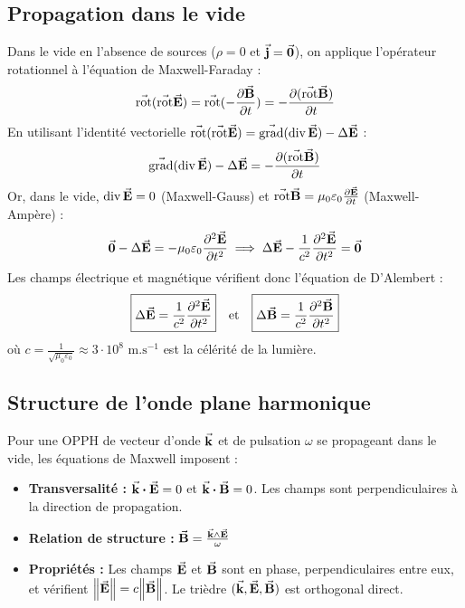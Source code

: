 \documentclass[a4paper,12pt]{article}
\renewcommand{\grad}{\va{\operatorname{grad}}}
\newcommand{\rot}{\va{\operatorname{rot}}}
\renewcommand{\div}{\operatorname{div}}
\begin{document}
        \subsection{Propagation dans le vide}
            Dans le vide en l'absence de sources ($\rho=0$ et $\va{j}=\va{0}$), on applique l'opérateur rotationnel à l'équation de Maxwell-Faraday :
            $$ \rot(\rot \va{E}) = \rot(-\pdv{\va{B}}{t}) = -\pdv{(\rot \va{B})}{t} $$
            En utilisant l'identité vectorielle $\rot(\rot \va{E}) = \grad(\div \va{E}) - \Delta \va{E}$ :
            $$ \grad(\div \va{E}) - \Delta \va{E} = -\pdv{(\rot \va{B})}{t} $$
            Or, dans le vide, $\div \va{E} = 0$ (Maxwell-Gauss) et $\rot \va{B} = \mu_0 \varepsilon_0 \pdv{\va{E}}{t}$ (Maxwell-Ampère) :
            $$ \va{0} - \Delta \va{E} = -\mu_0 \varepsilon_0 \pdv[2]{\va{E}}{t} \implies \Delta \va{E} - \frac{1}{c^2} \pdv[2]{\va{E}}{t} = \va{0} $$
            Les champs électrique et magnétique vérifient donc l'équation de D'Alembert :
            $$ \boxed{ \Delta \va{E} = \frac{1}{c^2} \pdv[2]{\va{E}}{t} } \quad \text{et} \quad \boxed{ \Delta \va{B} = \frac{1}{c^2} \pdv[2]{\va{B}}{t} } $$
            où $c = \frac{1}{\sqrt{\mu_0 \varepsilon_0}} \approx 3 \cdot 10^8 \text{ m.s}^{-1}$ est la célérité de la lumière.

        \subsection{Structure de l'onde plane harmonique}
            Pour une OPPH de vecteur d'onde $\va{k}$ et de pulsation $\omega$ se propageant dans le vide, les équations de Maxwell imposent :
            \begin{itemize}
                \item \textbf{Transversalité :} $\va{k} \vdot \va{E} = 0$ et $\va{k} \vdot \va{B} = 0$. Les champs sont perpendiculaires à la direction de propagation.
                \item \textbf{Relation de structure :} $\va{B} = \frac{\va{k} \wedge \va{E}}{\omega}$
                \item \textbf{Propriétés :} Les champs $\va{E}$ et $\va{B}$ sont en phase, perpendiculaires entre eux, et vérifient $\norm{\va{E}} = c \norm{\va{B}}$. Le trièdre $(\va{k}, \va{E}, \va{B})$ est orthogonal direct.
            \end{itemize}
\end{document}
